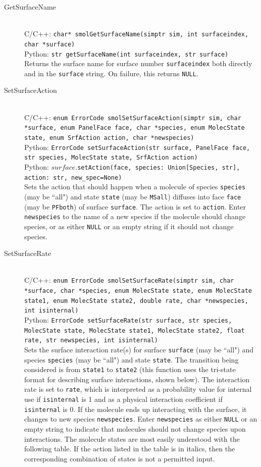 \documentclass {scrbook}
\newcommand {\ttt} {\texttt}
\begin{document}
\begin{description}
\item[GetSurfaceName]
\hfill \\
C/C++: \ttt{char* smolGetSurfaceName(simptr sim, int surfaceindex, char *surface)}\\
Python: \ttt{str getSurfaceName(int surfaceindex, str surface)}\\
Returns the surface name for surface number \ttt{surfaceindex} both directly and in the \ttt{surface} string. On failure, this returns \ttt{NULL}.

\item[SetSurfaceAction]
\hfill \\
C/C++: \ttt{enum ErrorCode smolSetSurfaceAction(simptr sim, char *surface, enum PanelFace face, char *species, enum MolecState state, enum SrfAction action, char *newspecies)}\\
Python: \ttt{ErrorCode setSurfaceAction(str surface, PanelFace face, str species, MolecState state, SrfAction action)}\\
Python: $surface$.\ttt{setAction(face, species: Union[Species, str], action: str, new\_spec=None)}\\
Sets the action that should happen when a molecule of species \ttt{species} (may be ``all") and state \ttt{state} (may be \ttt{MSall}) diffuses into face \ttt{face} (may be \ttt{PFboth}) of surface \ttt{surface}. The action is set to \ttt{action}. Enter \ttt{newspecies} to the name of a new species if the molecule should change species, or as either \ttt{NULL} or an empty string if it should not change species.

\item[SetSurfaceRate]
\hfill \\
C/C++: \ttt{enum ErrorCode smolSetSurfaceRate(simptr sim, char *surface, char *species, enum MolecState state, enum MolecState state1, enum MolecState state2, double rate, char *newspecies, int isinternal)}\\
Python: \ttt{ErrorCode setSurfaceRate(str surface, str species, MolecState state, MolecState state1, MolecState state2, float rate, str newspecies, int isinternal)}\\
Sets the surface interaction rate(s) for surface \ttt{surface} (may be ``all") and species \ttt{species} (may be ``all") and state \ttt{state}. The transition being considered is from \ttt{state1} to \ttt{state2} (this function uses the tri-state format for describing surface interactions, shown below). The interaction rate is set to \ttt{rate}, which is interpreted as a probability value for internal use if \ttt{isinternal} is 1 and as a physical interaction coefficient if \ttt{isinternal} is 0. If the molecule ends up interacting with the surface, it changes to new species \ttt{newspecies}. Enter \ttt{newspecies} as either \ttt{NULL} or an empty string to indicate that molecules should not change species upon interactions. The molecule states are most easily understood with the following table. If the action listed in the table is in italics, then the corresponding combination of states is not a permitted input.


\end{description}
\end{document}
